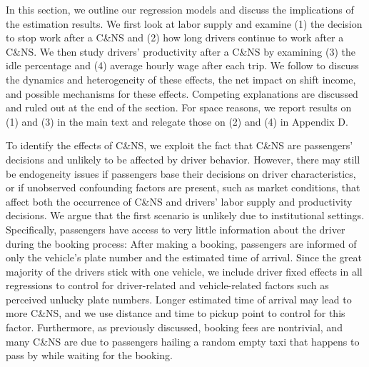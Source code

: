\documentclass[reviewmode]{restat}
\begin{document}
In this section, we outline our regression models and discuss the implications of the estimation results.
We first look at labor supply and examine (1) the decision to stop work after a C\&NS and (2) how long drivers
continue to work after a C\&NS. We then study drivers' productivity after a C\&NS by examining (3) the idle
percentage and (4) average hourly wage after each trip. We follow to discuss the dynamics and heterogeneity
of these effects, the net impact on shift income, and possible mechanisms for these effects. 
Competing explanations are discussed and ruled out at the end of the section. For space reasons, we report
results on (1) and (3) in the main text and relegate those on (2) and (4) in Appendix D. 

To identify the effects of C\&NS, we exploit the fact that C\&NS are passengers' decisions and unlikely to be
affected by driver behavior. However, there may still be endogeneity issues if passengers base their decisions 
on driver characteristics, or if unobserved confounding factors are present, such as market conditions,
that affect both the occurrence of C\&NS and drivers' labor supply and productivity decisions. 
We argue that the first scenario is unlikely due to institutional settings. Specifically, passengers have 
access to very little information about the driver during the booking process: After making a booking, 
passengers are informed of only the vehicle's plate number and the estimated time of arrival. 
Since the great majority of the drivers stick with one vehicle, we include driver fixed effects in all
regressions to control for driver-related and vehicle-related factors such as perceived unlucky plate numbers.
Longer estimated time of arrival may lead to more C\&NS, and we use distance and time to pickup point to 
control for this factor. 
Furthermore, as previously discussed, booking fees are nontrivial, and many C\&NS are due to passengers
hailing a random empty taxi that happens to pass by while waiting for the booking. 
\end{document}
